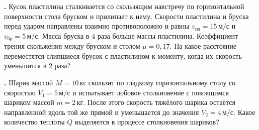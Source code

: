 \documentclass[12pt,a4paper]{article}
\newif\ifShowSolutions
\newcounter{banktask}
\newcommand{\BankTask}[3]{%
  \refstepcounter{banktask}%
  \Needspace{35mm}\par\medskip\noindent\begin{minipage}{\linewidth}%
  \noindent\textbf{\thebanktask.}\quad #2\par
  \ifShowSolutions
    #3\par
    \ifdefined\TutorEdition
      \ifcsname TutorSource#1\endcsname
        \smallskip{\small\csname TutorSource#1\endcsname\par}%
      \fi
    \fi
  \fi
  \end{minipage}\par\medskip
}
\begin{document}
\BankTask{sdamgia-2945}{
Кусок пластилина сталкивается со скользящим навстречу по горизонтальной поверхности стола бруском и прилипает к нему. Скорости пластилина и бруска перед ударом направлены взаимно противоположно и равны $v_{\text{пл}}=15\,\text{м/с}$ и $v_{\text{бр}}=5\,\text{м/с}.$ Масса бруска в $4$ раза больше массы пластилина. Коэффициент трения скольжения между бруском и столом $\mu=0{,}17.$ На какое расстояние переместятся слипшиеся брусок с пластилином к моменту, когда их скорость уменьшится в $2$ раза?
}{
\smallskip\noindent\textbf{Решение}\par
Пусть $m$ — масса куска пластилина, $M$ — масса бруска, $v_0$ — начальная скорость бруска с пластилином после взаимодействия. Согласно закону сохранения импульса: $Mv_{\text{бр}}-mv_{\text{пл}}=(M+m)v_0.$
Так как $M=4m$ и $v_{\text{бр}}=\frac13v_{\text{пл}},$ то $4m\frac13v_{\text{пл}}-mv_{\text{пл}}=5mv_0$ и $v_0=\frac1{15}v_{\text{пл}}.$
По условию конечная скорость бруска с пластилином $v=0{,}5v_0.$ 
По закону сохранения и изменения механической энергии: 


$\frac{(M+m)v_0^2}{2}=\frac{(M+m)v^2}{2}+\mu(M+m)gS,$
 откуда: 


$\frac{5m(\frac1{15}v_{\text{пл}})^2}{2}=\frac{5m(0{,}5\frac1{15}v_{\text{пл}})^2}{2}+5m\mu gS,$
 


$\frac{v_{\text{пл}}^2}{2\cdot15^2}-\frac{0{,}25v_{\text{пл}}^2}{2\cdot15^2}=\mu gS,$
 


$S=\frac{3}{8\cdot15^2}\frac{v_{\text{пл}}^2}{\mu g}=\frac{3\cdot15^2}{8\cdot15^2\cdot0{,}17\cdot10}\approx0{,}22\,\text{м}.$

Ответ: $S\approx0{,}22\,\text{м}.$
}

\BankTask{sdamgia-42048}{
Шарик массой $M=10\,\text{кг}$ скользит по гладкому горизонтальному столу со скоростью $V_1=5\,\text{м/с}$ и испытывает лобовое столкновение с покоящимся шариком массой $m=2\,\text{кг}$. После этого скорость тяжёлого шарика остаётся направленной вдоль той же прямой и уменьшается до значения $V_2=4\,\text{м/с}$. Какое количество теплоты $Q$ выделяется в процессе столкновения шариков?
}{
\smallskip\noindent\textbf{Решение}\par
$1$. Поскольку стол гладкий, в процессе столкновения шариков сохраняется проекция импульса системы на прямую, вдоль которой движутся шарики: $MV_1=MV_2+mv_2.$ Отсюда находим скорость второго шарика после столкновения: $v_2=\frac Mm(V_1-V_2)=5\,\text{м/с}.$
$2$. Из закона изменения механической энергии системы получаем, что разность кинетических энергий системы перед столкновением и после него равна искомому количеству теплоты: $E_{k1}-E_{k2}=Q.$ Здесь 


$E_{k1}=\frac{MV_1^2}{2}=10\cdot\frac{25}{2}=125\,\text{Дж},$
$E_{k2}=\frac{MV_2^2}{2}+\frac{mv_2^2}{2}=10\cdot\frac{16}{2}+2\cdot\frac{25}{2}=105\,\text{Дж}.$
$3$. Таким образом, $Q=125-105=20\,\text{Дж}.$
 
Ответ: $Q$ = $20\,\text{Дж}$.
}
\end{document}
